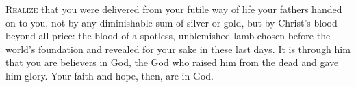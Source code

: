 \lettrine[lines=2,loversize=0.15]{R}{ealize} that you were delivered from your futile way of life your fathers handed on to you, not by any diminishable sum of silver or gold, but by Christ’s blood beyond all price: the blood of a spotless, unblemished lamb chosen before the world’s foundation and revealed for your sake in these last days. It is through him that you are believers in God, the God who raised him from the dead and gave him glory. Your faith and hope, then, are in God.